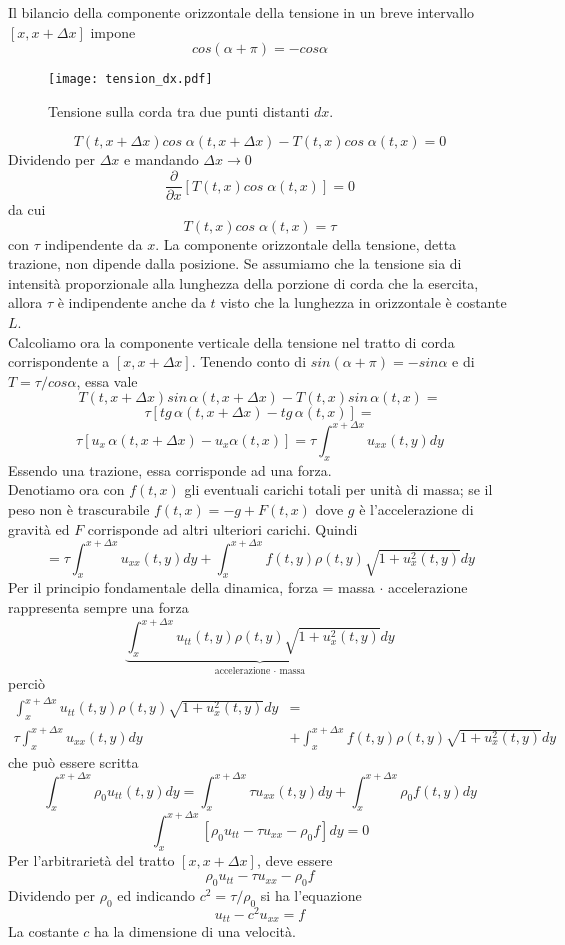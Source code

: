 Il bilancio della componente orizzontale della tensione in un breve intervallo 
$[x,x+\Delta x]$ impone
\[
	cos(\alpha + \pi)= - cos \alpha
\]
\begin{figure}[H]
	\centering
	\texttt{[image: tension\_dx.pdf]}
	\caption{Tensione sulla corda tra due punti distanti $dx$.}
	\label{tension_dx}
\end{figure}
\[
	T(t, x + \Delta x) cos \; \alpha(t, x + \Delta x)-
	T(t,x)cos \; \alpha(t,x)=0
\]
Dividendo per $\Delta x$ e mandando $\Delta x \to 0$
\[
	\frac{\partial}{\partial x}[T(t,x) cos \; \alpha(t,x)]=0
\]
da cui
\[
	T(t,x) cos \; \alpha(t,x)= \tau
\]
con $\tau$ indipendente da $x$.
La componente orizzontale della tensione, detta trazione, non dipende dalla
posizione. Se assumiamo che la tensione sia di intensit\`a proporzionale
alla lunghezza della porzione di corda che la esercita, allora $\tau$ \`e
indipendente anche da $t$ visto che la lunghezza in orizzontale \`e costante $L$.\\
Calcoliamo ora la componente verticale della tensione nel tratto di corda
corrispondente a $[x, x+ \Delta x]$. Tenendo conto di $sin(\alpha + \pi)= - sin \alpha$ e di $T= \tau/cos\alpha$, essa vale
\[
	T(t,x+\Delta x)sin \, \alpha(t, x+ \Delta x) - T(t,x)sin \, \alpha (t,x)=
\]
\[
	\tau[tg \, \alpha (t, x + \Delta x)- tg  \, \alpha(t,x)]=
\]
\[
	\tau[u_x \, \alpha (t, x + \Delta x)- u_x \alpha(t,x)]=
	\tau \int_x^{x+\Delta x} u_{xx}(t,y) dy
\]
Essendo una trazione, essa corrisponde ad una forza.\\
Denotiamo ora con $f(t,x)$ gli eventuali carichi totali per unit\`a di massa; se il
peso non \`e trascurabile $f(t,x)= -g + F(t,x)$ dove $g$ \`e l'accelerazione
di gravit\`a ed $F$ corrisponde ad altri ulteriori carichi. Quindi
\[
	=\tau \int_x^{x+\Delta x} u_{xx}(t,y) dy +
	\int_x^{x+\Delta x} f(t,y) \rho (t,y) \sqrt{1+ u_x^2(t,y)} dy
\]
Per il principio fondamentale della dinamica, forza = massa $\cdot$ accelerazione rappresenta sempre una forza
\[
	\underbrace{\int_x^{x+\Delta x} u_{tt}(t,y) \rho (t,y) \sqrt{1+ u_x^2(t,y)} dy}_{\text{accelerazione $\cdot$ massa}}
\]
perci\`o
\begin{align*}
	\int_x^{x+\Delta x} u_{tt}(t,y) \rho (t,y) \sqrt{1+ u_x^2(t,y)} dy&= \\
	\tau \int_x^{x+\Delta x} u_{xx}(t,y) dy &+
	\int_x^{x+\Delta x} f(t,y) \rho (t,y) \sqrt{1+ u_x^2(t,y)} dy
\end{align*}
che pu\`o essere scritta
\[
	\int_x^{x+\Delta x}\rho_0 u_{tt}(t,y)  dy=
	\int_x^{x+\Delta x} \tau u_{xx}(t,y) dy +
	\int_x^{x+\Delta x} \rho_0 f(t,y)  dy
\]
\[
	\int_x^{x+\Delta x} \left[
	\rho_0 u_{tt} - \tau u_{xx}-  \rho_0 f
	\right]dy= 0
\]
Per l'arbitrariet\`a del tratto $[x, x+ \Delta x]$, deve essere
\[
	\rho_0 u_{tt} - \tau u_{xx}-  \rho_0 f
\]
Dividendo per $\rho_0$ ed indicando $c^2=\tau / \rho_0$ si ha l'equazione
\[
	u_{tt} - c^2 u_{xx} = f
\]
La costante $c$ ha la dimensione di una velocit\`a.
